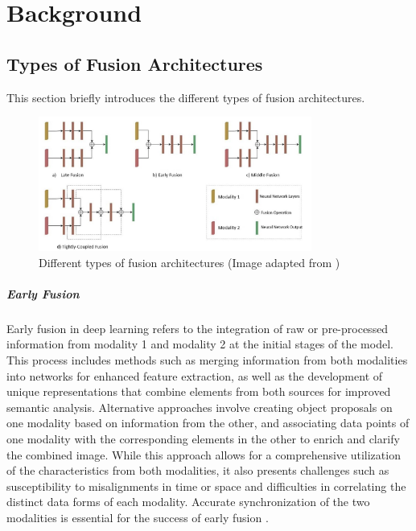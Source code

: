 \documentclass[report.tex]{subfiles}
\begin{document}
    \chapter{Background}

    \section{Types of Fusion Architectures}

    This section briefly introduces the different types of fusion architectures.

    \begin{figure}[h!]
        \centering
        \includegraphics[width=0.8\textwidth]{images/background/emt_fusion.png}
        \caption{Different types of fusion architectures (Image adapted from \cite{yao2023radar})}
        \label{fig:fusion_types}
    \end{figure}

    \paragraph*{Early Fusion} 

    Early fusion in deep learning refers to the integration of raw or pre-processed information from modality 1 and modality 2 at the initial stages of the model. This process includes methods such as merging information from both modalities into networks for enhanced feature extraction, as well as the development of unique representations that combine elements from both sources for improved semantic analysis. Alternative approaches involve creating object proposals on one modality based on information from the other, and associating data points of one modality with the corresponding elements in the other to enrich and clarify the combined image. While this approach allows for a comprehensive utilization of the characteristics from both modalities, it also presents challenges such as susceptibility to misalignments in time or space and difficulties in correlating the distinct data forms of each modality. Accurate synchronization of the two modalities is essential for the success of early fusion \cite{yao2023radar}.
\end{document}
